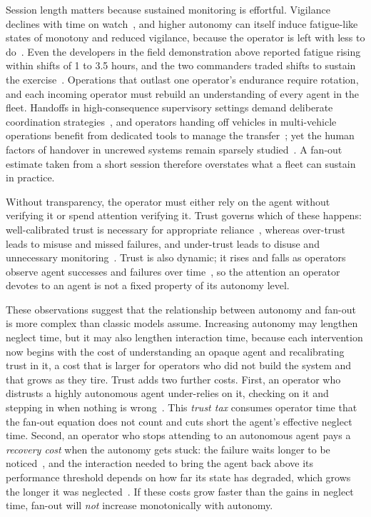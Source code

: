 \documentclass[conference]{IEEEtran}
\begin{document}
Session length matters because sustained monitoring is effortful.
Vigilance declines with time on watch~\cite{warm2008vigilance}, and higher autonomy
can itself induce fatigue-like states of monotony and reduced
vigilance, because the operator is left with less to
do~\cite{reybecerra2026mastering}. Even the developers in the field
demonstration above reported fatigue rising within shifts of 1 to 3.5
hours, and the two commanders traded shifts to sustain the
exercise~\cite{adams2023single}. Operations that outlast one
operator's endurance require rotation, and each incoming operator must
rebuild an understanding of every agent in the fleet. Handoffs in
high-consequence supervisory settings demand deliberate coordination
strategies~\cite{patterson2004handoff}, and operators handing off
vehicles in multi-vehicle operations benefit from dedicated tools to
manage the transfer~\cite{chandarana2022streamlining}; yet the human
factors of handover in uncrewed systems remain sparsely
studied~\cite{grindley2025handover}. A
fan-out estimate taken from a short session therefore overstates what
a fleet can sustain in practice.

Without transparency, the operator must either rely on the agent
without verifying it or spend attention verifying it. Trust governs
which of these happens: well-calibrated trust is necessary for
appropriate reliance~\cite{lee2004trust}, whereas over-trust leads to
misuse and missed failures, and under-trust leads to disuse and
unnecessary monitoring~\cite{parasuraman1997humans}. Trust is also
dynamic; it rises and falls as operators observe agent successes and
failures over time~\cite{hoff2015trust,devisser2020towards}, so the
attention an operator devotes to an agent is not a fixed property of
its autonomy level.

These observations suggest that the relationship between autonomy
and fan-out is more complex than classic models assume. Increasing
autonomy may lengthen neglect time, but it may also lengthen
interaction time, because each intervention now begins with the
cost of understanding an opaque agent and recalibrating trust in it,
a cost that is larger for operators who did not build the system and
that grows as they tire. Trust adds two further costs. First, an
operator who distrusts a highly autonomous agent under-relies on it,
checking on it and stepping in when nothing is
wrong~\cite{parasuraman1997humans,lee2004trust}. This \emph{trust tax}
consumes operator time that the fan-out equation does not count and
cuts short the agent's effective neglect time. Second, an operator who
stops attending to an autonomous agent pays a \emph{recovery cost}
when the autonomy gets stuck: the failure waits longer to be
noticed~\cite{cummings2008predicting}, and the interaction needed to
bring the agent back above its performance threshold depends on how
far its state has degraded, which grows the longer it was
neglected~\cite{cummings2008predicting,crandall2011computing}. If
these costs grow faster than the gains in neglect time, fan-out will
\emph{not} increase monotonically with autonomy.
\end{document}
